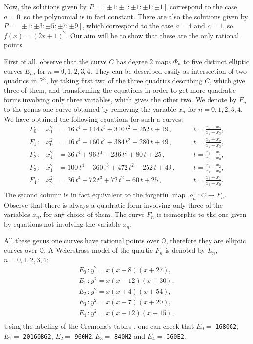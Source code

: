 \documentclass[a4paper,12pt]{amsart}
\theoremstyle{remark}
\theoremstyle{definition}
\begin{document}
Now, the solutions given by $P=[\pm 1:\pm 1:\pm 1:\pm 1:\pm 1]$
correspond to the case $a=0$, so the polynomial is in fact
constant. There are also the solutions given by $P=[\pm1:\pm 3:\pm
5:\pm 7:\pm 9]$, which correspond to the case $a=4$ and $c=1$, so
$f(x)=(2x+1)^2$. Our aim will be to show that these are the only
rational points.

First of all, observe that the curve $C$ has degree $2$ maps
$\Phi_n$ to five distinct elliptic curves $E_n$, for $n=0,1,2,3,4$.
They can be described easily as intersection of two quadrics in
${{\mathbb{P}}}^3$, by taking first two of the three quadrics describing $C$,
which give three of them, and transforming the equations in order
to get more quadratic forms involving only three variables, which
gives the other two. We denote by $F_n$ to the genus one curve obtained by removing the variable $x_n$ for $n=0,1,2,3,4$.
We have obtained the following equations for such a curves:
$$
\begin{array}{lrlll}
F_0\,:&x_{1}^2 & =16\,t^4 -144\,t^3+340\,t^2-252\,t+49\,, & \quad & t=\frac{x_4+x_2}{x_4-x_3},\\[1.5mm]
F_1\,:&x_{0}^2 & =16\,t^4 -160\,t^3+384\,t^2-280\,t+49\,, & \quad & t=\frac{x_4+x_2}{x_4-x_3},\\[1.5mm]
F_2\,:& x_4^2 & =36\,t^4 + 96\,t^3 - 236\,t^2 + 80\,t + 25\,, & \quad & t=\frac{x_3+x_1}{x_3-x_0},\\[1.5mm]
F_3\,:&x_{1}^2 & =100\,t^4-360\,t^3+472\,t^2-252\,t+49\,, & \quad & t=\frac{x_4+x_2}{x_4-x_0},\\[1.5mm]
F_4\,:&x_2^2 & =36\,t^4 - 72\,t^3 + 72\,t^2 - 60\,t + 25\,, & \quad &t= \frac{x_3+x_1}{x_3-x_0}.\\[1.5mm]
\end{array}
$$
The second column is in fact equivalent to the forgetful map
$\varrho_n:C\longrightarrow F_n$. Observe that there is always a
quadratic form involving only three of the variables $x_n$, for
any choice of them. The curve $F_n$ is isomorphic to the one given
by equations not involving the variable $x_n$.

All these genus one curves have rational points over ${{\mathbb{Q}}}$,
therefore they are elliptic curves over ${{\mathbb{Q}}}$. A Weierstrass model
of the quartic $F_n$ is denoted by $E_n$, $n=0,1,2,3,4$:
$$
\begin{array}{l}
E_0\,:y^2 = x(x-8)(x+27),\\[1.1mm]
E_1\,:y^2 =  x(x-12)(x+30), \\[1.1mm]
E_2\,:y^2 =  x(x+4)(x+54), \\[1.1mm]
E_3\,:y^2 =   x(x-7)(x+20), \\[1.1mm]
E_4\,:y^2 =   x(x-12)(x-15). \\[1.1mm]
\end{array}
$$
Using the labeling of the Cremona's tables \cite{cremonaweb}, one
can check that $E_0= $ \verb+1680G2+, $E_1= $ \verb+20160BG2+,
$E_2=$ \verb+960H2+$, E_3= $ \verb+840H2+ and $E_4=$ \verb+360E2+.
\end{document}
